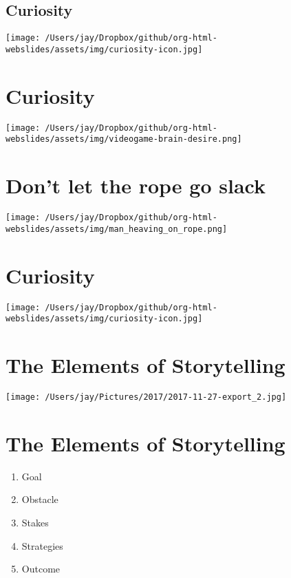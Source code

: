 \documentclass[12pt]{article}
\begin{document}
\subsection{Curiosity}
\label{sec:org5630c3b}
\begin{center}
\texttt{[image: /Users/jay/Dropbox/github/org-html-webslides/assets/img/curiosity-icon.jpg]}
\end{center}

\section{Curiosity}
\label{sec:org611b907}
\begin{center}
\texttt{[image: /Users/jay/Dropbox/github/org-html-webslides/assets/img/videogame-brain-desire.png]}
\end{center}

\section{Don't let the \textbf{rope} go \textbf{slack}}
\label{sec:org64c2e01}
\begin{center}
\texttt{[image: /Users/jay/Dropbox/github/org-html-webslides/assets/img/man\_heaving\_on\_rope.png]}
\end{center}

\section{Curiosity}
\label{sec:orge85d8cc}
\begin{center}
\texttt{[image: /Users/jay/Dropbox/github/org-html-webslides/assets/img/curiosity-icon.jpg]}
\end{center}

\section{The Elements of Storytelling}
\label{sec:orgb9a170c}
\begin{center}
\texttt{[image: /Users/jay/Pictures/2017/2017-11-27-export\_2.jpg]}
\end{center}

\section{The \textbf{Elements} of \textbf{Storytelling}}
\label{sec:org626e29f}
\begin{enumerate}
\item Goal
\item Obstacle
\item Stakes
\item Strategies
\item Outcome
\end{enumerate}
\end{document}
